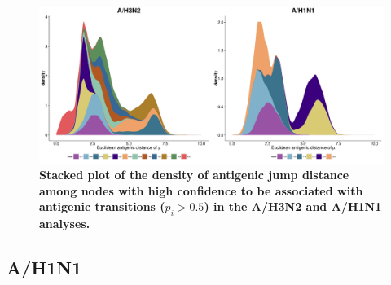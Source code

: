 \documentclass[11pt,oneside,letterpaper]{article}
\begin{document}
\begin{figure}[h]
	\centering		
	\includegraphics[width=1\textwidth]{figures/custom/stackedMuPlot}
	\caption{\textbf{Stacked plot of the density of antigenic jump distance among nodes with high confidence to be associated with antigenic transitions ($p_i > 0.5$)  in the A/H3N2 and A/H1N1 analyses.}
	} 
	\label{stackedMuPlot} 
\end{figure}









\subsection*{A/H1N1}
\end{document}

